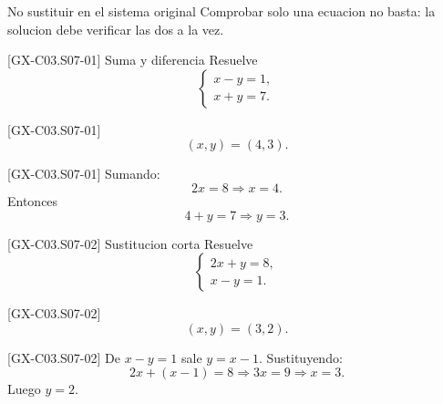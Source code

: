 \begin{commonerror}{No sustituir en el sistema original}
Comprobar solo una ecuacion no basta: la solucion debe verificar las dos a la vez.
\end{commonerror}

\begin{guidedexercise}{[GX-C03.S07-01] Suma y diferencia}
Resuelve
\[
\begin{cases}
x-y=1,\\
x+y=7.
\end{cases}
\]
\end{guidedexercise}

\begin{shortanswer}{[GX-C03.S07-01]}
\[
(x,y)=(4,3).
\]
\end{shortanswer}

\begin{fullsolution}{[GX-C03.S07-01]}
Sumando:
\[
2x=8 \Longrightarrow x=4.
\]
Entonces
\[
4+y=7 \Longrightarrow y=3.
\]
\end{fullsolution}

\begin{guidedexercise}{[GX-C03.S07-02] Sustitucion corta}
Resuelve
\[
\begin{cases}
2x+y=8,\\
x-y=1.
\end{cases}
\]
\end{guidedexercise}

\begin{shortanswer}{[GX-C03.S07-02]}
\[
(x,y)=(3,2).
\]
\end{shortanswer}

\begin{fullsolution}{[GX-C03.S07-02]}
De \(x-y=1\) sale \(y=x-1\). Sustituyendo:
\[
2x+(x-1)=8 \Longrightarrow 3x=9 \Longrightarrow x=3.
\]
Luego \(y=2\).
\end{fullsolution}

